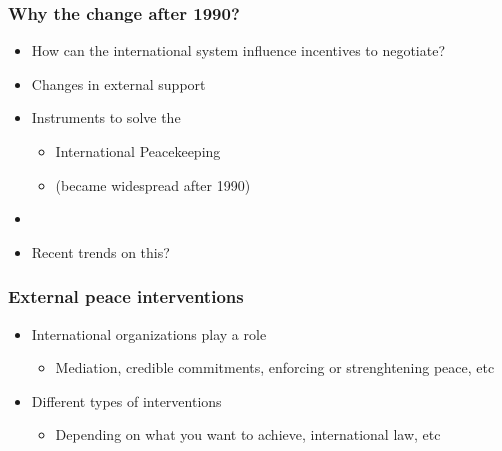\documentclass[aspectratio=43]{beamer}
\begin{document}
\begin{frame}
\frametitle{Why the change after 1990?}
\centering

\begin{itemize}
  \item How can the international system influence incentives to negotiate?
  \item<2->[1.] Changes in external support
  \item<3->[2.] Instruments to solve the {\color{red}{credible commitment problem}}
  \begin{itemize}
    \item<4-> International Peacekeeping
    \item<4->[] (became widespread after 1990)
  \end{itemize}
  \item<5->[]
  \item<5-> Recent trends on this?
\end{itemize}

\end{frame}

\begin{frame}
\frametitle{External peace interventions}
\centering

\begin{itemize}
  \item International organizations play a role
  \begin{itemize}
    \item Mediation, credible commitments, enforcing or strenghtening peace, etc
  \end{itemize}
  \item<2-> Different types of interventions
  \begin{itemize}
    \item Depending on what you want to achieve, international law, etc
  \end{itemize}
\end{itemize}

\end{frame}
\end{document}
